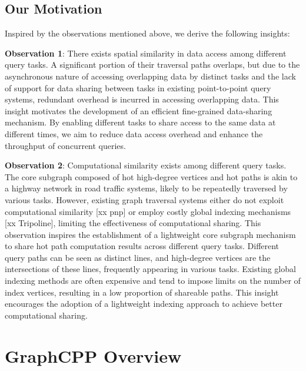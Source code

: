 \documentclass[lettersize,journal]{IEEEtran} %
\begin{document}
\subsection{Our Motivation}
Inspired by the observations mentioned above, we derive the following insights:

{\bf{Observation 1}}: There exists spatial similarity in data access among different query tasks. A significant portion of their traversal paths overlaps, but due to the asynchronous nature of accessing overlapping data by distinct tasks and the lack of support for data sharing between tasks in existing point-to-point query systems, redundant overhead is incurred in accessing overlapping data. This insight motivates the development of an efficient fine-grained data-sharing mechanism. By enabling different tasks to share access to the same data at different times, we aim to reduce data access overhead and enhance the throughput of concurrent queries.

{\bf{Observation 2}}: Computational similarity exists among different query tasks. The core subgraph composed of hot high-degree vertices and hot paths is akin to a highway network in road traffic systems, likely to be repeatedly traversed by various tasks. However, existing graph traversal systems either do not exploit computational similarity [xx pnp] or employ costly global indexing mechanisms [xx Tripoline], limiting the effectiveness of computational sharing. This observation inspires the establishment of a lightweight core subgraph mechanism to share hot path computation results across different query tasks. Different query paths can be seen as distinct lines, and high-degree vertices are the intersections of these lines, frequently appearing in various tasks. Existing global indexing methods are often expensive and tend to impose limits on the number of index vertices, resulting in a low proportion of shareable paths. This insight encourages the adoption of a lightweight indexing approach to achieve better computational sharing.

\section{GraphCPP Overview}
\end{document}
